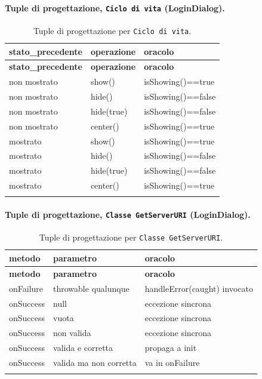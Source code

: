 \paragraph*{Tuple di progettazione, \texttt{Ciclo di vita} (LoginDialog).}

{\footnotesize\setlength{\tabcolsep}{3pt}
\begin{longtable}{>{\raggedright\arraybackslash}p{}>{\raggedright\arraybackslash}p{}>{\raggedright\arraybackslash}p{}}
\toprule
\textbf{stato\_precedente} & \textbf{operazione} & \textbf{oracolo} \\
\midrule
\endfirsthead
\toprule
\textbf{stato\_precedente} & \textbf{operazione} & \textbf{oracolo} \\
\midrule
\endhead
\bottomrule
\endfoot
non mostrato & show() & isShowing()==true \\
non mostrato & hide() & isShowing()==false \\
non mostrato & hide(true) & isShowing()==false \\
non mostrato & center() & isShowing()==true \\
mostrato & show() & isShowing()==true \\
mostrato & hide() & isShowing()==false \\
mostrato & hide(true) & isShowing()==false \\
mostrato & center() & isShowing()==true \\
\bottomrule
\caption{Tuple di progettazione per \texttt{Ciclo di vita}.}
\label{tab:logindialog-lifecycle-tuple}
\end{longtable}
}



\paragraph*{Tuple di progettazione, \texttt{Classe GetServerURI} (LoginDialog).}

{\footnotesize\setlength{\tabcolsep}{3pt}
\begin{longtable}{>{\raggedright\arraybackslash}p{}>{\raggedright\arraybackslash}p{}>{\raggedright\arraybackslash}p{}}
\toprule
\textbf{metodo} & \textbf{parametro} & \textbf{oracolo} \\
\midrule
\endfirsthead
\toprule
\textbf{metodo} & \textbf{parametro} & \textbf{oracolo} \\
\midrule
\endhead
\bottomrule
\endfoot
onFailure & throwable qualunque & handleError(caught) invocato \\
onSuccess & null & eccezione sincrona \\
onSuccess & vuota & eccezione sincrona \\
onSuccess & non valida & eccezione sincrona \\
onSuccess & valida e corretta & propaga a init \\
onSuccess & valida ma non corretta & va in onFailure \\
\bottomrule
\caption{Tuple di progettazione per \texttt{Classe GetServerURI}.}
\label{tab:logindialog-getserveruri-tuple}
\end{longtable}
}



